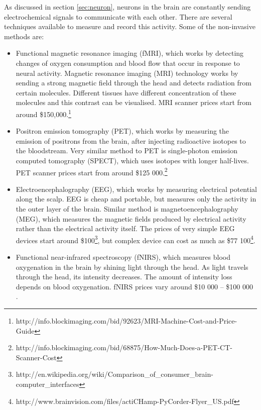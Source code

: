 As discussed in section \ref{sec:neuron}, neurons in the brain are constantly sending electrochemical signals to communicate with each other. There are several techniques available to measure and record this activity. Some of the non-invasive methods are:
\begin{itemize}
	\item Functional magnetic resonance imaging (fMRI), which works by detecting changes of oxygen consumption and blood flow that occur in response to neural activity. Magnetic resonance imaging (MRI) technology works by sending a strong magnetic field through the head and detects radiation from certain molecules. Different tissues have different concentration of these molecules and this contrast can be visualised. MRI scanner prices start from around \$150,000.\footnote{http://info.blockimaging.com/bid/92623/MRI-Machine-Cost-and-Price-Guide}
	\item Positron emission tomography (PET), which works by measuring the emission of positrons from the brain, after injecting radioactive isotopes to the bloodstream. Very similar method to PET is single-photon emission computed tomography (SPECT), which uses isotopes with longer half-lives. PET scanner prices start from around \$125 000.\footnote{http://info.blockimaging.com/bid/68875/How-Much-Does-a-PET-CT-Scanner-Cost}
	\item Electroencephalography (EEG), which works by measuring electrical potential along the scalp. EEG is cheap and portable, but measures only the activity in the outer layer of the brain. Similar method is magnetoencephalography (MEG), which measures the magnetic fields produced by electrical activity rather than the electrical activity itself. The prices of very simple EEG devices start around \$100\footnote{http://en.wikipedia.org/wiki/Comparison\_of\_consumer\_brain-computer\_interfaces}, but complex device can cost as much as \$77 100\footnote{http://www.brainvision.com/files/actiCHamp-PyCorder-Flyer\_US.pdf}.
	\item Functional near-infrared spectroscopy (fNIRS), which measures blood oxygenation in the brain by shining light through the head. As light travels through the head, its intensity decreases. The amount of intensity loss depends on blood oxygenation. fNIRS prices vary around \$10 000 -- \$100 000 \cite{NIRS}.
\end{itemize}
